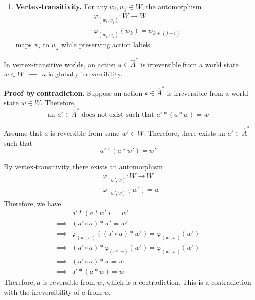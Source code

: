 \begin{proofE}
\begin{enumerate}[(1)]
    \item \textbf{Vertex-transitivity.}
    For any $w_{i}, w_{j} \in W$, the automorphism
    \begin{equation}
    \begin{aligned}
        & \varphi_{(w_{i}, w_{j})}: W \to W \\
        & \varphi_{(w_{i}, w_{j})}(w_{k}) = w_{k+(j-i)}
    \end{aligned}
    \end{equation}
    maps $w_{i}$ to $w_{j}$ while preserving action labels.
\end{enumerate}
\end{proofE}


\begin{propositionE}[][normal]
    In vertex-transitive worlds, an action $a \in \hat{A}^{*}$ is irreversible from a world state $w \in W$ $\implies$ $a$ is globally irreversibility.
\end{propositionE}
\begin{proofE}
    \textbf{Proof by contradiction.}
    Suppose an action $a \in \hat{A}^{*}$ is irreversible from a world state $w \in W$.
    Therefore,
    \begin{equation}
        \text{an } a' \in \hat{A}^{*} \text{ does not exist such that } a' \ast (a \ast w) = w
    \end{equation}

    Assume that $a$ is reversible from some $w' \in W$.
    Therefore, there exists an $a' \in \hat{A}^{*}$ such that
    \begin{equation}
        a' \ast (a \ast w') = w'
    \end{equation}

    By vertex-transitivity, there exists an automorphism
    \begin{equation}
    \begin{aligned}
        & \varphi_{(w', w)}: W \to W \\
        & \varphi_{(w', w)}(w') = w
    \end{aligned}
    \end{equation}
    Therefore, we have
    \begin{align}
        & a' \ast (a \ast w') = w' \\
        \implies & (a' \circ a) \ast w' = w' \\
        \implies & \varphi_{(w', w)}((a' \circ a) \ast w') = \varphi_{(w', w)}(w') \\
        \implies & (a' \circ a) \ast \varphi_{(w', w)}(w') = \varphi_{(w', w)}(w') \\
        \implies & (a' \circ a) \ast w = w \\
        \implies & a' \ast (a \ast w) = w
    \end{align}
    Therefore, $a$ is reversible from $w$, which is a contradiction.
    This is a contradiction with the irreversibility of $a$ from $w$.
\end{proofE}



